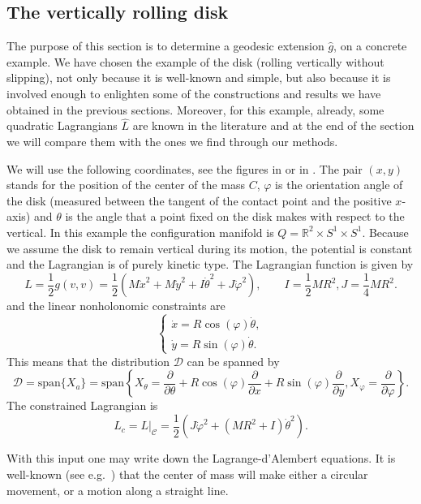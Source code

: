 \documentclass[11pt]{article}
\def\C{{\mathcal C}}
\def\I{I}
\def\J{J}
\def\m{M}
\def\Ra{R}
\begin{document}
\subsection{The vertically rolling disk}

 The purpose of this section is to determine a geodesic extension  $\hat{g}$, on a concrete example. We have chosen the example of the disk (rolling vertically without slipping), not only  because it is well-known and simple, but also  because it is involved enough to enlighten some of the constructions and results we have obtained in the previous sections. Moreover, for this example, already, some quadratic Lagrangians $\hat L$ are known in the literature \cite{BFM,Simoes} and at the end of the section we will compare them with the ones we find through our methods.

 

We will use the following coordinates, see the figures in \cite{FB} or in \cite{TomBrussel}. The  pair $(x,y)$ stands for the position of the center of the mass $C$, 
$\varphi$ is the orientation angle of the disk (measured between the tangent of the contact point and the positive $x$-axis) and  $\theta$ is the  angle  that a point fixed
on the disk makes with respect to the vertical. In this example the configuration manifold is $Q=\mathbb{R}^2\times S^1\times S^1$. Because we assume the disk to remain vertical during its motion, the potential is constant and the Lagrangian is of purely kinetic type. The Lagrangian function is given by 
$$
L=\frac{1}{2}g(v,v) = \frac{1}{2}(\m\dot{x}^2+\m\dot{y}^2+\I\dot{\theta}^2+\J\dot{\varphi}^2), \qquad \I = \frac{1}{2}\m\Ra^2, \J = \frac{1}{4}\m\Ra^2. 
$$
and the linear nonholonomic constraints are 
\begin{equation}
\begin{cases}
\dot{x}=\Ra\cos(\varphi)\dot{\theta},\\
\dot{y}=\Ra\sin(\varphi)\dot{\theta}.
\end{cases} \nonumber
\end{equation}
This means that the distribution $\mathcal{D}$ can be spanned by 
$$
\mathcal{D}=\text{span}\{X_a\}=\textrm{span}\left\{X_\theta=\frac{\partial}{\partial \theta}+\Ra\cos(\varphi)\frac{\partial}{\partial x}+\Ra \sin(\varphi)\frac{\partial}{\partial y}, X_\varphi=\frac{\partial}{\partial \varphi}  \right\}.
$$ 
The constrained Lagrangian is 
\[
L_c = L|_\C =  \frac{1}{2}(\J\dot{\varphi}^2+(\m\Ra^2+\I)\dot{\theta}^2). 
\]


With this input one may write down the Lagrange-d'Alembert equations. It is well-known (see e.g.\ \cite{Bloch,Cortes,BFM}) that the center of mass will make either a circular movement, or a motion along a straight line.
\end{document}
